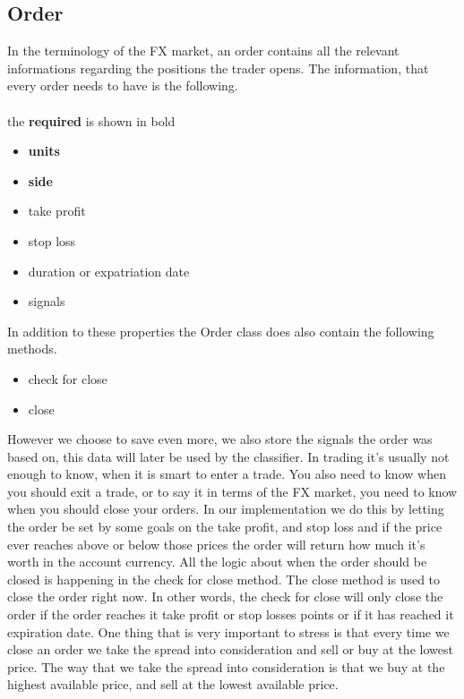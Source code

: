 \subsection{Order}
In the terminology of the FX market, an order contains all the relevant informations regarding the positions the trader opens. The information, that every order needs to have is the following.
\\
\\
the \textbf{required} is shown in bold
\begin{itemize}
\item{\textbf{units}}
\item{\textbf{side}}
\item{take profit}
\item{stop loss}
\item{duration or expatriation date}
\item{signals}
\end{itemize}

In addition to these properties the Order class does also contain the following methods.
\begin{itemize}
\item{check for close}
\item{close}
\end{itemize}

However we choose to save even more, we also store the signals the order was based on, this data will later be used by the classifier. 
In trading it's usually not enough to know, when it is smart to enter a trade. You also need to know when you should exit a trade, or to say it in terms of the FX market, you need to know when you should close your orders. In our implementation we do this by letting the order be set by some goals on the take profit, and stop loss and if the price ever reaches above or below those prices the order will return how much it's worth in the account currency. All the logic about when the order should be closed is happening in the check for close method. The close method is used to close the order right now. In other words, the check for close will only close the order if the order reaches it take profit or stop losses points or if it has reached it expiration date.
One thing that is very important to stress is that every time we close an order we take the spread into consideration and sell or buy at the lowest price. The way that we take the spread into consideration is that we buy at the highest available price, and sell at the lowest available price.

